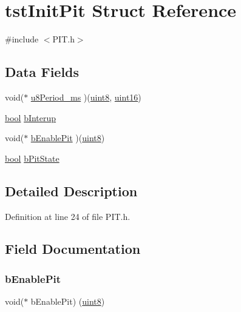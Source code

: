 \hypertarget{structtst_init_pit}{}\section{tst\+Init\+Pit Struct Reference}
\label{structtst_init_pit}


{\ttfamily \#include $<$P\+I\+T.\+h$>$}

\subsection*{Data Fields}
\begin{DoxyCompactItemize}
\item 
void($\ast$ \mbox{\hyperlink{structtst_init_pit_a74832dd7d9dc2eae8d3c5e7844fb17c4}{u8\+Period\+\_\+ms}} )(\mbox{\hyperlink{_p_i_t_8h_adde6aaee8457bee49c2a92621fe22b79}{uint8}}, \mbox{\hyperlink{_p_i_t_8h_a05f6b0ae8f6a6e135b0e290c25fe0e4e}{uint16}})
\item 
\mbox{\hyperlink{_p_i_t_8h_abb452686968e48b67397da5f97445f5b}{bool}} \mbox{\hyperlink{structtst_init_pit_a7818fb2979d6d3d3c27911297204c800}{b\+Interup}}
\item 
void($\ast$ \mbox{\hyperlink{structtst_init_pit_a1dd1828fa586c05aefd0e1e005fb41fb}{b\+Enable\+Pit}} )(\mbox{\hyperlink{_p_i_t_8h_adde6aaee8457bee49c2a92621fe22b79}{uint8}})
\item 
\mbox{\hyperlink{_p_i_t_8h_abb452686968e48b67397da5f97445f5b}{bool}} \mbox{\hyperlink{structtst_init_pit_a832f44d0b291d7ce1d051834a0d22e7e}{b\+Pit\+State}}
\end{DoxyCompactItemize}


\subsection{Detailed Description}


Definition at line 24 of file P\+I\+T.\+h.



\subsection{Field Documentation}
\mbox{\label{structtst_init_pit_a1dd1828fa586c05aefd0e1e005fb41fb}} 
\subsubsection{\texorpdfstring{bEnablePit}{bEnablePit}}
{\footnotesize\ttfamily void($\ast$ b\+Enable\+Pit) (\mbox{\hyperlink{_p_i_t_8h_adde6aaee8457bee49c2a92621fe22b79}{uint8}})}



